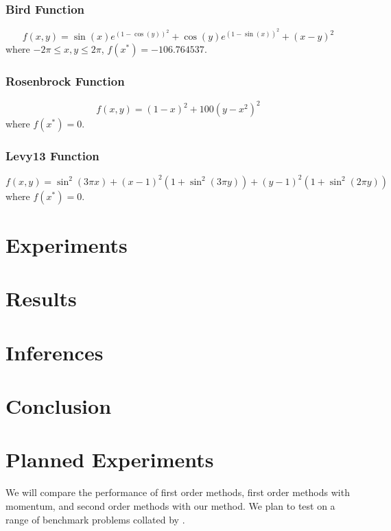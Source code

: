\documentclass{article}
\begin{document}
\subsubsection{Bird Function}
\begin{equation}
f(x,y) = \sin(x)e^{(1-\cos(y))^2} + \cos(y)e^{(1-\sin(x))^2} + (x-y)^2
\end{equation}
where $-2\pi \le x,y \le 2\pi$, $f(x^*)=-106.764537$.

\subsubsection{Rosenbrock Function}
\begin{equation}
f(x,y) = (1-x)^2 + 100(y-x^2)^2
\end{equation}
where $f(x^*)=0$.

\subsubsection{Levy13 Function}
\begin{equation}
f(x,y) = \sin^2(3\pi x) + (x-1)^2\left(1+\sin^2(3\pi y)\right) + (y-1)^2\left(1+\sin^2(2\pi y)\right)
\end{equation}
where $f(x^*)=0$.




\section{Experiments}\label{experiments}

\section{Results}\label{results}

\section{Inferences}\label{inferences}

\section{Conclusion}\label{conclusion}


\section{Planned Experiments}

We will compare the performance of first order methods, first order methods with momentum, and second order methods with our method. We plan to test on a range of benchmark problems collated by \citet{jamil2013literature}.
\end{document}
